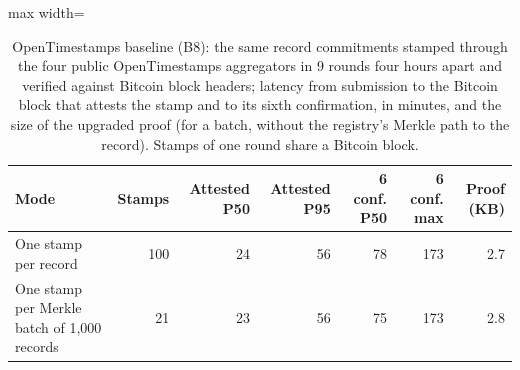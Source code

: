 \begin{table}[t]
\centering
\scriptsize
\caption{OpenTimestamps baseline (B8): the same record commitments stamped through the four public OpenTimestamps aggregators in 9 rounds four hours apart and verified against Bitcoin block headers; latency from submission to the Bitcoin block that attests the stamp and to its sixth confirmation, in minutes, and the size of the upgraded proof (for a batch, without the registry's Merkle path to the record). Stamps of one round share a Bitcoin block.}
\label{tab:ots}
\begin{adjustbox}{max width=\linewidth}
\begin{tabular}{lrrrrrr}
\toprule
Mode & Stamps & Attested P50 & Attested P95 & 6 conf. P50 & 6 conf. max & Proof (KB) \\
\midrule
One stamp per record & 100 & 24 & 56 & 78 & 173 & 2.7 \\
One stamp per Merkle batch of 1,000 records & 21 & 23 & 56 & 75 & 173 & 2.8 \\
\bottomrule
\end{tabular}\end{adjustbox}
\end{table}

